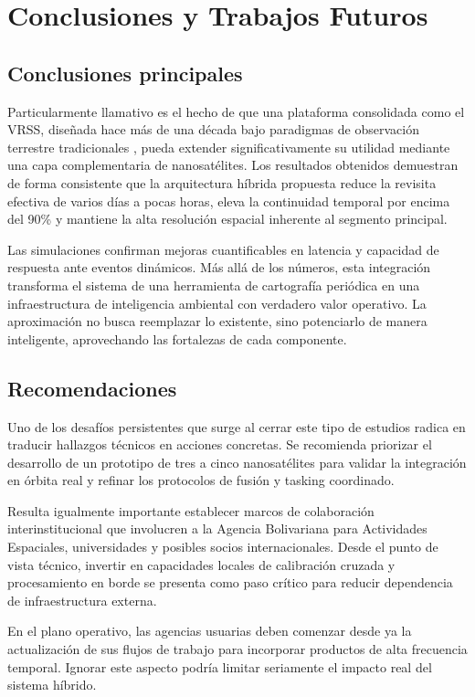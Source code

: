 \section{Conclusiones y Trabajos Futuros}

\subsection{Conclusiones principales}

Particularmente llamativo es el hecho de que una plataforma consolidada como el VRSS, diseñada hace más de una década bajo paradigmas de observación terrestre tradicionales \cite{VRSS1_2012}, pueda extender significativamente su utilidad mediante una capa complementaria de nanosatélites. Los resultados obtenidos demuestran de forma consistente que la arquitectura híbrida propuesta reduce la revisita efectiva de varios días a pocas horas, eleva la continuidad temporal por encima del 90\% y mantiene la alta resolución espacial inherente al segmento principal.

Las simulaciones confirman mejoras cuantificables en latencia y capacidad de respuesta ante eventos dinámicos. Más allá de los números, esta integración transforma el sistema de una herramienta de cartografía periódica en una infraestructura de inteligencia ambiental con verdadero valor operativo. La aproximación no busca reemplazar lo existente, sino potenciarlo de manera inteligente, aprovechando las fortalezas de cada componente.

\subsection{Recomendaciones}

Uno de los desafíos persistentes que surge al cerrar este tipo de estudios radica en traducir hallazgos técnicos en acciones concretas. Se recomienda priorizar el desarrollo de un prototipo de tres a cinco nanosatélites para validar la integración en órbita real y refinar los protocolos de fusión y tasking coordinado. 

Resulta igualmente importante establecer marcos de colaboración interinstitucional que involucren a la Agencia Bolivariana para Actividades Espaciales, universidades y posibles socios internacionales. Desde el punto de vista técnico, invertir en capacidades locales de calibración cruzada y procesamiento en borde se presenta como paso crítico para reducir dependencia de infraestructura externa.

En el plano operativo, las agencias usuarias deben comenzar desde ya la actualización de sus flujos de trabajo para incorporar productos de alta frecuencia temporal. Ignorar este aspecto podría limitar seriamente el impacto real del sistema híbrido.

